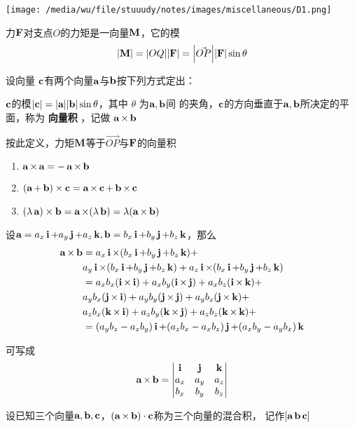 \documentclass[11pt]{article}
\begin{document}
\begin{center}
\texttt{[image: /media/wu/file/stuuudy/notes/images/miscellaneous/D1.png]}
\end{center}
力\(\bF\)对支点\(O\)的力矩是一向量\(\bM\)，它的模
\begin{equation*}
\abs{\bM}=\abs{OQ}\abs{\bF}=\abs{\vec{OP}}\abs{\bF}\sin\theta
\end{equation*}

设向量 \(\bc\)有两个向量\(\ba\)与\(\bb\)按下列方式定出：

\(\bc\)的模\(\abs{\bc}=\abs{\ba}\abs{\bb}\sin\theta\)，其中 \(\theta\) 为\(\ba,\bb\)间
的夹角，\(\bc\)的方向垂直于\(\ba,\bb\)所决定的平面，称为 \textbf{向量积} ，记做
\(\ba\times\bb\)

按此定义，力矩\(\bM\)等于\(\vec{OP}\)与\(\bF\)的向量积

\begin{enumerate}
\item \(\ba\times\ba=-\ba\times\bb\)
\item \((\ba+\bb)\times\bc=\ba\times\bc+\bb\times\bc\)
\item \((\lambda\ba)\times\bb=\ba\times(\lambda\bb)=\lambda(\ba\times\bb)\)
\end{enumerate}


设\(\ba=a_x\bi+a_y\bj+a_z\bk,\bb=b_x\bi+b_y\bj+b_z\bk\)，那么
\begin{align*}
\ba\times\bb&=
a_x\bi\times(b_x\bi+b_y\bj+b_z\bk)+\\
&a_y\bi\times(b_x\bi+b_y\bj+b_z\bk)+a_z\bi\times(b_x\bi+b_y\bj+b_z\bk)\\
&=a_xb_x(\bi\times\bi)+a_xb_y(\bi\times\bj)+a_xb_z(\bi\times\bk)+\\
&a_yb_x(\bj\times\bi)+a_yb_y(\bj\times\bj)+a_yb_z(\bj\times\bk)+\\
&a_zb_x(\bk\times\bi)+a_zb_y(\bk\times\bj)+a_zb_z(\bk\times\bk)+\\
&=(a_yb_z-a_zb_y)\bi+
(a_zb_x-a_xb_z)\bj+
(a_xb_y-a_yb_x)\bk
\end{align*}

可写成
\begin{equation*}
\ba\times\bb=
\begin{vmatrix}
\bi&\bj&\bk\\
a_x&a_y&a_z\\
b_x&b_y&b_z
\end{vmatrix}
\end{equation*}

设已知三个向量\(\ba,\bb,\bc\)，\((\ba\times\bb)\cdot\bc\)称为三个向量的混合积，
记作\([\ba\bb\bc]\)
\end{document}
